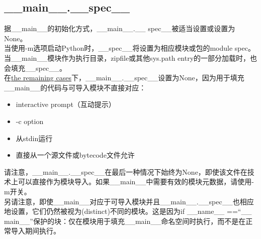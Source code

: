 \documentclass[10pt,UTF8]{ctexart}
\begin{document}
\subsection{__main__.__spec__}
据__main__的初始化方式，__main__.__ spec__被适当设置或设置为None。\\
\indent 当使用-m选项启动Python时，__spec__将设置为相应模块或包的module spec。当__main__模块作为执行目录，zipfile或其他sys.path entry的一部分加载时，也会填充__spec__。\\
\indent 在\href{https://docs.python.org/3/using/cmdline.html#using-on-interface-options}{the remaining cases}下，__main__.__spec__设置为None，因为用于填充__main__的代码与可导入模块不直接对应：
\begin{itemize}
\item interactive prompt（互动提示）
\item -c option
\item 从stdin运行
\item 直接从一个源文件或bytecode文件允许
\end{itemize}
请注意，__main__.__spec__在最后一种情况下始终为None，即使该文件在技术上可以直接作为模块导入。如果__main__中需要有效的模块元数据，请使用-m开关。\\
\indent 另请注意，即使__main__对应于可导入模块并且__main__.__spec__也相应地设置，它们仍然被视为(distinct)不同的模块。这是因为if __name__ ==“__ main__”保护的块：仅在模块用于填充__main__命名空间时执行，而不是在正常导入期间执行。
\end{document}
